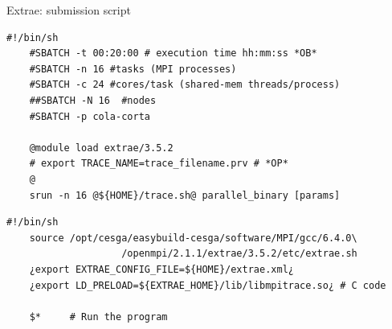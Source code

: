 \documentclass[10pt,xcolor=table]{beamer}
\begin{document}

\begin{frame}[fragile]{Extrae: submission script}

  \vspace*{-0.2cm}
  \begin{lstlisting}[style=shell,gobble=3,caption={submit\_trace.sh}]
    #!/bin/sh
    #SBATCH -t 00:20:00 # execution time hh:mm:ss *OB*
    #SBATCH -n 16 #tasks (MPI processes)
    #SBATCH -c 24 #cores/task (shared-mem threads/process)
    ##SBATCH -N 16  #nodes
    #SBATCH -p cola-corta

    @module load extrae/3.5.2
    # export TRACE_NAME=trace_filename.prv # *OP*
    @
    srun -n 16 @${HOME}/trace.sh@ parallel_binary [params]
  \end{lstlisting}

  \pause

  \vspace*{-0.2cm}
  \begin{lstlisting}[style=shell,gobble=3,caption={trace.sh}]
    #!/bin/sh
    source /opt/cesga/easybuild-cesga/software/MPI/gcc/6.4.0\
                    /openmpi/2.1.1/extrae/3.5.2/etc/extrae.sh
    ¿export EXTRAE_CONFIG_FILE=${HOME}/extrae.xml¿
    ¿export LD_PRELOAD=${EXTRAE_HOME}/lib/libmpitrace.so¿ # C code

    $*     # Run the program
  \end{lstlisting}
\end{frame}
\end{document}
